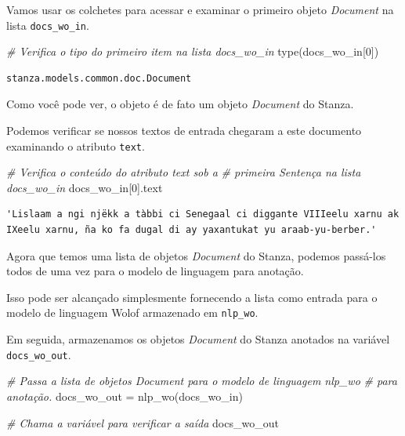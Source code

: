 \documentclass[
  brazilian,
]{article}
\newenvironment{Shaded}{}{}
\newcommand{\BuiltInTok}[1]{#1}
\newcommand{\CommentTok}[1]{\textcolor[rgb]{0.38,0.63,0.69}{\textit{#1}}}
\newcommand{\DecValTok}[1]{\textcolor[rgb]{0.25,0.63,0.44}{#1}}
\newcommand{\NormalTok}[1]{#1}
\newcommand{\OperatorTok}[1]{\textcolor[rgb]{0.40,0.40,0.40}{#1}}
\begin{document}
Vamos usar os colchetes para acessar e examinar o primeiro objeto
\emph{Document} na lista \texttt{docs\_wo\_in}.

\begin{Shaded}
\begin{Highlighting}[]
\CommentTok{\# Verifica o tipo do primeiro item na lista \textquotesingle{}docs\_wo\_in\textquotesingle{}}
\BuiltInTok{type}\NormalTok{(docs\_wo\_in[}\DecValTok{0}\NormalTok{])}
\end{Highlighting}
\end{Shaded}

\begin{verbatim}
stanza.models.common.doc.Document
\end{verbatim}

Como você pode ver, o objeto é de fato um objeto \emph{Document} do
Stanza.

Podemos verificar se nossos textos de entrada chegaram a este documento
examinando o atributo \texttt{text}.

\begin{Shaded}
\begin{Highlighting}[]
\CommentTok{\# Verifica o conteúdo do atributo \textquotesingle{}text\textquotesingle{} sob a}
\CommentTok{\# primeira Sentença na lista \textquotesingle{}docs\_wo\_in\textquotesingle{}}
\NormalTok{docs\_wo\_in[}\DecValTok{0}\NormalTok{].text}
\end{Highlighting}
\end{Shaded}

\begin{verbatim}
'Lislaam a ngi njëkk a tàbbi ci Senegaal ci diggante VIIIeelu xarnu ak IXeelu xarnu, ña ko fa dugal di ay yaxantukat yu araab-yu-berber.'
\end{verbatim}

Agora que temos uma lista de objetos \emph{Document} do Stanza, podemos
passá-los todos de uma vez para o modelo de linguagem para anotação.

Isso pode ser alcançado simplesmente fornecendo a lista como entrada
para o modelo de linguagem Wolof armazenado em \texttt{nlp\_wo}.

Em seguida, armazenamos os objetos \emph{Document} do Stanza anotados na
variável \texttt{docs\_wo\_out}.

\begin{Shaded}
\begin{Highlighting}[]
\CommentTok{\# Passa a lista de objetos Document para o modelo de linguagem \textquotesingle{}nlp\_wo\textquotesingle{}}
\CommentTok{\# para anotação.}
\NormalTok{docs\_wo\_out }\OperatorTok{=}\NormalTok{ nlp\_wo(docs\_wo\_in)}

\CommentTok{\# Chama a variável para verificar a saída}
\NormalTok{docs\_wo\_out}
\end{Highlighting}
\end{Shaded}
\end{document}
